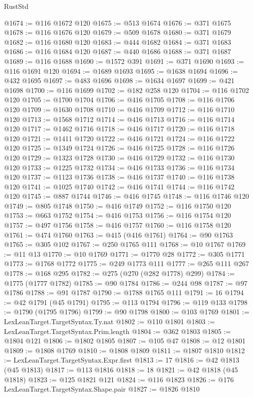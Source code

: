\begin{lexlean}{RustStd}
\begin{coremodule}
@1674 := @116 @1672 @120
@1675 := @513 @1674
@1676 := @371 @1675
@1678 := @116 @1676 @120
@1679 := @509 @1678
@1680 := @371 @1679
@1682 := @116 @1680 @120
@1683 := @444 @1682
@1684 := @371 @1683
@1686 := @116 @1684 @120
@1687 := @440 @1686
@1688 := @371 @1687
@1689 := @116 @1688
@1690 := @1572 @391
@1691 := @371 @1690
@1693 := @116 @1691 @120
@1694 := @1689 @1693
@1695 := @1638 @1694
@1696 := @432 @1695
@1697 := @483 @1696
@1698 := @1634 @1697
@1699 := @421 @1698
@1700 := @116 @1699
@1702 := @182 @258 @120
@1704 := @116 @1702 @120
@1705 := @1700 @1704
@1706 := @416 @1705
@1708 := @116 @1706 @120
@1709 := @1630 @1708
@1710 := @416 @1709
@1712 := @116 @1710 @120
@1713 := @1568 @1712
@1714 := @416 @1713
@1716 := @116 @1714 @120
@1717 := @1462 @1716
@1718 := @416 @1717
@1720 := @116 @1718 @120
@1721 := @1411 @1720
@1722 := @416 @1721
@1724 := @116 @1722 @120
@1725 := @1349 @1724
@1726 := @416 @1725
@1728 := @116 @1726 @120
@1729 := @1323 @1728
@1730 := @416 @1729
@1732 := @116 @1730 @120
@1733 := @1225 @1732
@1734 := @416 @1733
@1736 := @116 @1734 @120
@1737 := @1123 @1736
@1738 := @416 @1737
@1740 := @116 @1738 @120
@1741 := @1025 @1740
@1742 := @416 @1741
@1744 := @116 @1742 @120
@1745 := @887 @1744
@1746 := @416 @1745
@1748 := @116 @1746 @120
@1749 := @805 @1748
@1750 := @416 @1749
@1752 := @116 @1750 @120
@1753 := @663 @1752
@1754 := @416 @1753
@1756 := @116 @1754 @120
@1757 := @497 @1756
@1758 := @416 @1757
@1760 := @116 @1758 @120
@1761 := @474 @1760
@1763 := @415 (@416 @1761)
@1764 := @90 @1763
@1765 := @305 @102
@1767 := @250 @1765 @111
@1768 := @10 @1767
@1769 := @11 @13
@1770 := @10 @1769
@1771 := @1770 @28
@1772 := @305 @1771
@1773 := @1768 @1772
@1775 := @249 @1773 @111
@1777 := @265 @111 @267
@1778 := @168 @295
@1782 := @275 (@270 (@282 @1778) @299)
@1784 := @1775 (@1777 @1782)
@1785 := @90 @1784
@1786 := @244 @98
@1787 := @97 @1786
@1788 := @91 @1787
@1790 := @1788 @1765 @111
@1791 := 16
@1794 := @42 @1791 (@45 @1791)
@1795 := @113 @1794
@1796 := @119 @133
@1798 := @1790 (@1795 @1796)
@1799 := @90 @1798
@1800 := @103 @1769
@1801 := LexLeanTarget.TargetSyntax.Ty.nat
@1802 := @110 @1801
@1803 := LexLeanTarget.TargetSyntax.Prim.length
@1804 := @362 @1803
@1805 := @1804 @121
@1806 := @1802 @1805
@1807 := @105 @47
@1808 := @12 @1801
@1809 := @1808 @1769
@1810 := @1808 @1809
@1811 := @1807 @1810
@1812 := LexLeanTarget.TargetSyntax.Expr.first
@1813 := 17
@1816 := @42 @1813 (@45 @1813)
@1817 := @113 @1816
@1818 := 18
@1821 := @42 @1818 (@45 @1818)
@1823 := @125 @1821 @121
@1824 := @116 @1823
@1826 := @176 LexLeanTarget.TargetSyntax.Shape.pair
@1827 := @1826 @1810

\end{coremodule}
\end{lexlean}
